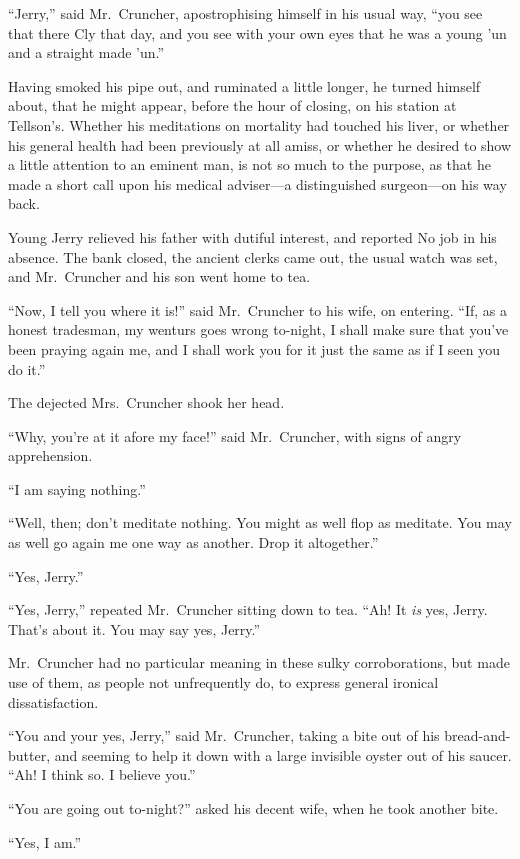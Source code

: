 ``Jerry,'' said Mr.\ Cruncher, apostrophising himself in his usual way,
``you see that there Cly that day, and you see with your own eyes that
he was a young 'un and a straight made 'un.''

Having smoked his pipe out, and ruminated a little longer, he turned
himself about, that he might appear, before the hour of closing, on his
station at Tellson's.  Whether his meditations on mortality had touched
his liver, or whether his general health had been previously at all
amiss, or whether he desired to show a little attention to an eminent
man, is not so much to the purpose, as that he made a short call upon
his medical adviser---a distinguished surgeon---on his way back.

Young Jerry relieved his father with dutiful interest, and reported No
job in his absence.  The bank closed, the ancient clerks came out, the
usual watch was set, and Mr.\ Cruncher and his son went home to tea.

``Now, I tell you where it is!'' said Mr.\ Cruncher to his wife, on
entering.  ``If, as a honest tradesman, my wenturs goes wrong to-night,
I shall make sure that you've been praying again me, and I shall work
you for it just the same as if I seen you do it.''

The dejected Mrs.\ Cruncher shook her head.

``Why, you're at it afore my face!'' said Mr.\ Cruncher, with signs of
angry apprehension.

``I am saying nothing.''

``Well, then; don't meditate nothing.  You might as well flop as
meditate.  You may as well go again me one way as another.
Drop it altogether.''

``Yes, Jerry.''

``Yes, Jerry,'' repeated Mr.\ Cruncher sitting down to tea.  ``Ah!
It \emph{is} yes, Jerry.  That's about it.  You may say yes, Jerry.''

Mr.\ Cruncher had no particular meaning in these sulky corroborations,
but made use of them, as people not unfrequently do, to express
general ironical dissatisfaction.

``You and your yes, Jerry,'' said Mr.\ Cruncher, taking a bite out of his
bread-and-butter, and seeming to help it down with a large invisible
oyster out of his saucer.  ``Ah! I think so.  I believe you.''

``You are going out to-night?'' asked his decent wife, when he took
another bite.

``Yes, I am.''

